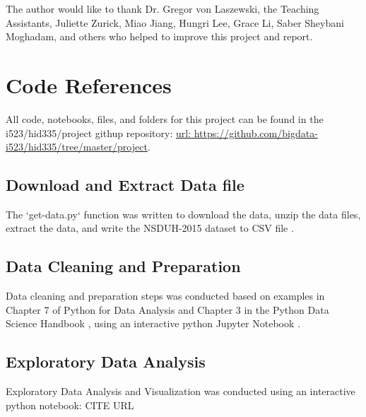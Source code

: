 \documentclass[sigconf]{acmart}
\begin{document}
\begin{acks}

The author would like to thank Dr. Gregor von Laszewski, the Teaching 
Assistants, Juliette Zurick, Miao Jiang, Hungri Lee, Grace Li, Saber Sheybani
Moghadam, and others who helped to improve this project and report.

\end{acks}


 


\appendix



\section{Code References}

All code, notebooks, files, and folders for this project can be found in the
i523/hid335/project githup repository: 
\url{url:  https://github.com/bigdata-i523/hid335/tree/master/project}.

\subsection{Download and Extract Data file}

The `get-data.py` function was written to download the data, unzip the data
files, extract the data, and write the NSDUH-2015 dataset to CSV file 
\cite{getdata17}.

\subsection{Data Cleaning and Preparation}

Data cleaning and preparation steps was conducted based on examples in 
Chapter 7 of Python for Data Analysis \cite{mckinney17} and Chapter 3 in 
the Python Data Science Handbook \cite{vanderplas17}, using an interactive 
python Jupyter Notebook \cite{data17}.

\subsection{Exploratory Data Analysis}

Exploratory Data Analysis and Visualization was conducted using an interactive
python notebook: CITE URL
\end{document}
